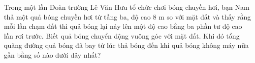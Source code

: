 \begin{ex}
Trong một lần Đoàn trường Lê Văn Hưu tổ chức chơi bóng chuyền hơi, bạn Nam thả một quả bóng chuyền hơi từ tầng ba, độ cao $8$ m so với mặt đất và thấy rằng mỗi lần chạm đất thì quả bóng lại nảy lên một độ cao bằng ba phần tư độ cao lần rơi trước. Biết quả bóng chuyển động vuông góc với mặt đất. Khi đó tổng quãng đường quả bóng đã bay từ lúc thả bóng đến khi quả bóng không máy nữa gần bằng số nào dưới đây nhất?
\end{ex}
